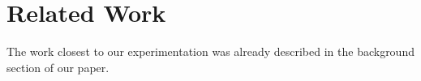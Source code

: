 \section{Related Work} \label{sec:related}

The work closest to our experimentation was already described in the background
section of our paper.
